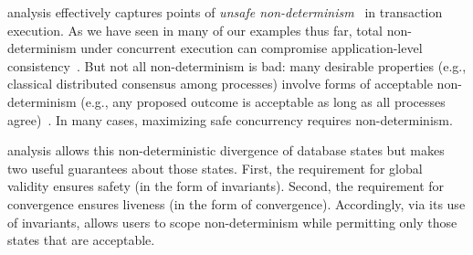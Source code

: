  \iconfluence analysis effectively
captures points of \textit{unsafe
  non-determinism}~\cite{consistency-borders} in transaction
execution. As we have seen in many of our examples thus far, total
non-determinism under concurrent execution can compromise
application-level consistency~\cite{calm,termrewriting}. But not all
non-determinism is bad: many desirable properties (e.g.,
classical distributed consensus among processes) involve forms 
of acceptable non-determinism (e.g., any proposed outcome is
acceptable as long as all processes agree)~\cite{paxos-commit}. In
many cases, maximizing safe concurrency requires non-determinism.

\iconfluence analysis allows this non-deterministic divergence of
database states but makes two useful guarantees about those
states. First, the requirement for global validity ensures safety (in
the form of invariants). Second, the requirement for convergence
ensures liveness (in the form of convergence). Accordingly, via its
use of invariants, \iconfluence allows users to scope non-determinism
while permitting only those states that are acceptable.



